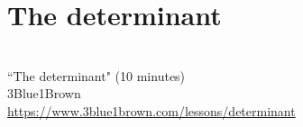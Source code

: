 \section{The determinant}
\begin{bookfigure}
   \\
  ``The determinant" (10 minutes) \\
  \footnotesize 3Blue1Brown \\
  \url{https://www.3blue1brown.com/lessons/determinant}
\end{bookfigure}

